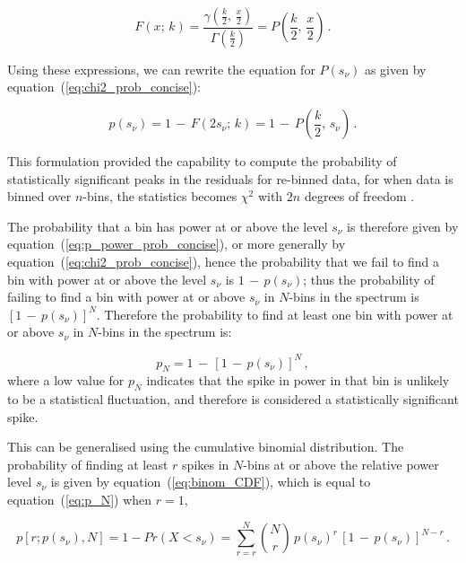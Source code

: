 \begin{equation}
F(x; \, k) = \frac{\gamma (\frac{k}{2}, \, \frac{x}{2})}{\Gamma(\frac{k}{2})} = P\left(\frac{k}{2}, \, \frac{x}{2}\right) \, .
\label{eq:chi2_CDF}
\end{equation}


Using these expressions, we can rewrite the equation for $P(s_{\nu})$ as given by equation~(\ref{eq:chi2_prob_concise}): 

\begin{equation}
p(s_{\nu}) = 1 \, - \, F(2s_{\nu}; \, k) =1 \, - \, P\left(\frac{k}{2}, \, s_{\nu}\right) \, .
\label{eq:chi2_prob_concise}
\end{equation}

This formulation provided the capability to compute the probability of statistically significant peaks in the residuals for re-binned data, for when data is binned over $n$-bins, the statistics becomes $\chi^{2}$ with $2n$ degrees of freedom \citep{appourchaux_detecting_2004}.

The probability that a bin has power at or above the level $s_{\nu}$ is therefore given by equation~(\ref{eq:p_power_prob_concise}), or more generally by equation~(\ref{eq:chi2_prob_concise}), hence the probability that we fail to find a bin with power at or above the level $s_{\nu}$ is $1 \, - \, p(s_{\nu})$; thus the probability of failing to find a bin with power at or above $s_{\nu}$ in $N$-bins in the spectrum is $[1 \, - \, p(s_{\nu})]^N$. Therefore the probability to find at least one bin with power at or above $s_{\nu}$ in $N$-bins in the spectrum is:

\begin{equation}
p_N = 1\, - \, [1 \, - \, p(s_{\nu})]^N \, ,
\label{eq:p_N}
\end{equation}
%
where a low value for $p_N$ indicates that the spike in power in that bin is unlikely to be a statistical fluctuation, and therefore is considered a statistically significant spike.

This can be generalised using the cumulative binomial distribution. The probability of finding at least $r$ spikes in $N$-bins at or above the relative power level $s_{\nu}$ is given by equation~(\ref{eq:binom_CDF}), which is equal to equation~(\ref{eq:p_N}) when $r=1$,

\begin{equation}
p[r; p(s_\nu), N] = 1 - Pr(X < s_{\nu}) = \sum_{r=r}^{N} \binom{N}{r} \, p(s_{\nu})^r \, [1 \, - \, p(s_{\nu})]^{N-r} \, .
\label{eq:binom_CDF}
\end{equation}

